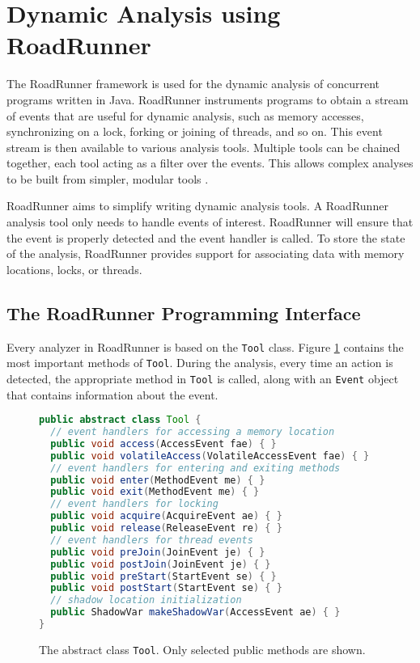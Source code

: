 \section{Dynamic Analysis using RoadRunner}
\label{roadRunnerUsage}

The RoadRunner framework is used for the dynamic analysis of concurrent programs
written in Java. RoadRunner instruments programs to obtain a stream of events
that are useful for dynamic analysis, such as memory accesses, synchronizing on
a lock, forking or joining of threads, and so on. This event stream is then
available to various analysis tools. Multiple tools can be chained together,
each tool acting as a filter over the events. This allows complex analyses to be
built from simpler, modular tools \cite{RoadRunner}.

RoadRunner aims to simplify writing dynamic analysis tools. A RoadRunner
analysis tool only needs to handle events of interest. RoadRunner will ensure
that the event is properly detected and the event handler is called. To store
the state of the analysis, RoadRunner provides support for associating data with
memory locations, locks, or threads.

\subsection{The RoadRunner Programming Interface}

Every analyzer in RoadRunner is based on the \texttt{Tool} class. Figure
\ref{toolclass} contains the most important methods of \texttt{Tool}. During the
analysis, every time an action is detected, the appropriate method in
\texttt{Tool} is called, along with an \texttt{Event} object that contains
information about the event.

\begin{figure}[hbt]
    \label{toolclass}
    \begin{lstlisting}[language=java]
public abstract class Tool {
  // event handlers for accessing a memory location
  public void access(AccessEvent fae) { }
  public void volatileAccess(VolatileAccessEvent fae) { }
  // event handlers for entering and exiting methods
  public void enter(MethodEvent me) { }
  public void exit(MethodEvent me) { }
  // event handlers for locking
  public void acquire(AcquireEvent ae) { }
  public void release(ReleaseEvent re) { }
  // event handlers for thread events
  public void preJoin(JoinEvent je) { }
  public void postJoin(JoinEvent je) { }
  public void preStart(StartEvent se) { }
  public void postStart(StartEvent se) { }
  // shadow location initialization
  public ShadowVar makeShadowVar(AccessEvent ae) { }
}
    \end{lstlisting}
    \caption{The abstract class \texttt{Tool}. Only selected public methods are
    shown.}
\end{figure}

